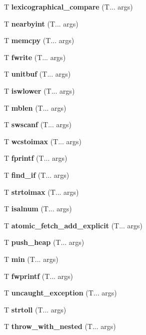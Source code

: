 \begin{DoxyCompactItemize}
\mbox{\label{lexicographical_compare}} 
T \textbf{ lexicographical\+\_\+compare} (T... args)
\item 
\mbox{\label{nearbyint}} 
T \textbf{ nearbyint} (T... args)
\item 
\mbox{\label{memcpy}} 
T \textbf{ memcpy} (T... args)
\item 
\mbox{\label{fwrite}} 
T \textbf{ fwrite} (T... args)
\item 
\mbox{\label{unitbuf}} 
T \textbf{ unitbuf} (T... args)
\item 
\mbox{\label{iswlower}} 
T \textbf{ iswlower} (T... args)
\item 
\mbox{\label{mblen}} 
T \textbf{ mblen} (T... args)
\item 
\mbox{\label{fwscanf}} 
T \textbf{ swscanf} (T... args)
\item 
\mbox{\label{wcstoimax}} 
T \textbf{ wcstoimax} (T... args)
\item 
\mbox{\label{fprintf}} 
T \textbf{ fprintf} (T... args)
\item 
\mbox{\label{find}} 
T \textbf{ find\+\_\+if} (T... args)
\item 
\mbox{\label{strtoimax}} 
T \textbf{ strtoimax} (T... args)
\item 
\mbox{\label{isalnum}} 
T \textbf{ isalnum} (T... args)
\item 
\mbox{\label{atomic_fetch_add}} 
T \textbf{ atomic\+\_\+fetch\+\_\+add\+\_\+explicit} (T... args)
\item 
\mbox{\label{push_heap}} 
T \textbf{ push\+\_\+heap} (T... args)
\item 
\mbox{\label{min}} 
T \textbf{ min} (T... args)
\item 
\mbox{\label{fwprintf}} 
T \textbf{ fwprintf} (T... args)
\item 
\mbox{\label{uncaught_exception}} 
T \textbf{ uncaught\+\_\+exception} (T... args)
\item 
\mbox{\label{strtol}} 
T \textbf{ strtoll} (T... args)
\item 
\mbox{\label{throw_with_nested}} 
T \textbf{ throw\+\_\+with\+\_\+nested} (T... args)

\end{DoxyCompactItemize}
